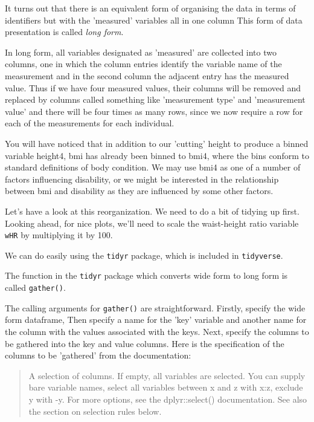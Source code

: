 \documentclass[titlepage]{book}\usepackage{knitr}
\begin{document}
It turns out that there is an equivalent form of organising the data in terms of identifiers but with the 'measured' variables all in one column  This form of data presentation is called \textsl{long form}. 

In long form, all variables designated as 'measured' are collected into two columns, one in which the column entries identify the variable name of the measurement and in the second column the adjacent entry has the measured value. Thus if we have four measured values, their columns will be removed and replaced by columns called something like 'measurement type' and 'measurement value' and there will be four times as many rows, since we now require a row for each of the measurements for each individual.

You will have noticed that in addition to our 'cutting' height to produce a binned variable height4, bmi has already been binned to bmi4, where the bins conform to standard definitions of body condition. We may use bmi4 as one of a number of factors influencing disability, or we might be interested in the relationship between bmi and disability as they are influenced by some other factors.

Let's have a look at this reorganization. We need to do a bit of tidying up first. Looking ahead, for nice plots, we'll need to scale the waist-height ratio variable \texttt{wHR} by multiplying it by 100.

  We can do easily using the \texttt{tidyr} package, which is included in \texttt{tidyverse}.

The function in the \texttt{tidyr} package which converts wide form to long form is called \texttt{gather()}.

The calling arguments for \texttt{gather()} are straightforward. Firstly, specify the wide form dataframe, Then specify a name for the 'key' variable and another name for the column with the values associated with the keys.  Next, specify the columns to be gathered into the key and value columns. Here is the specification of the columns to be 'gathered' from the documentation:

\begin{quote}
A selection of columns. If empty, all variables are selected. You can supply bare variable names, select all variables between x and z with x:z, exclude y with -y. For more options, see the dplyr::select() documentation. See also the section on selection rules below.
\end{quote}
\end{document}
